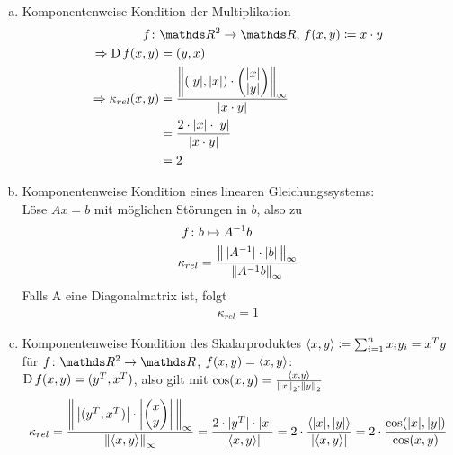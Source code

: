 \begin{Bspe}~
  \begin{enumerate}[a)]
  \item Komponentenweise Kondition der Multiplikation
    \begin{align*}
      f\colon &\R^2 \rightarrow \R, \, f(x,y) \coloneqq x\cdot y \\
      \Rightarrow \D f(x,y) &= (y, x)  \\
      \Rightarrow \kappa_{rel}(x,y) 
              &= \frac{\left\| (|y|, |x|)
                \cdot \begin{pmatrix}
                  |x| \\
                  |y|
                \end{pmatrix}\right\|_\infty}{|x\cdot y|} \\
              &= \frac{2\cdot|x|\cdot |y|}{|x\cdot y|} \\
              &= 2
    \end{align*}
  \item Komponentenweise Kondition eines linearen Gleichungssystems:\\
    Löse $Ax=b$ mit möglichen Störungen in $b$, also zu
    \begin{align*}
      f\colon & b\mapsto A^{-1}b \\
      \kappa_{rel} & = \frac{\nn[\,|A^{-1}|\cdot|b|\,]_\infty}{\nn[A^{-1}b]_\infty}
    \end{align*}
    Falls A eine Diagonalmatrix ist, folgt
    \begin{gather*}
      \kappa_{rel}=1
    \end{gather*}
  \item Komponentenweise Kondition des Skalarproduktes 
    $\scp{x}{y}\coloneqq \sum_{i=1}^{n}x_i y_i = x^Ty$ für
    $f\colon\R^2 \to \R$, $f(x,y) = \scp{x}{y}$:\\
    $\D f(x,y) = (y^T, x^T)$, also gilt mit
    $\cos(x,y) = \frac{\scp{x}{y}}{\nn[x]_2 \cdot \nn[y]_2}$
    \begin{gather*}
      \kappa_{rel}  
      = \frac{\nn[
        \,\left|(y^T, x^T)\right|
        \cdot\left|\begin{pmatrix}x\\y\end{pmatrix}\right|\,
        ]_\infty }
      {\nn[\langle x,y\rangle]_\infty}
      = \frac{2\cdot |y^T|\cdot |x|}{|\langle x,y\rangle|} 
      = 2\cdot \frac{\langle |x|,|y|\rangle}{|\langle x,y\rangle|} 
      = 2 \cdot \frac{\cos(|x|, |y|)}{\cos(x,y)}  
    \end{gather*}

\end{enumerate}
\end{Bspe}
